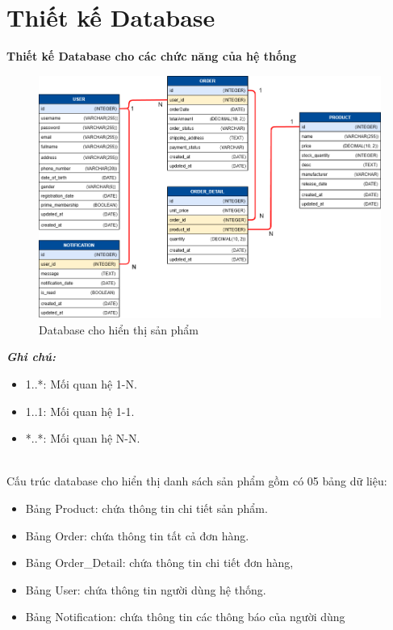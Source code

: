 \section{Thiết kế Database}
\textbf{Thiết kế Database cho các chức năng của hệ thống}
 \begin{figure}[H]
    \begin{center}
    \includegraphics[scale = 0.4]{images/phat/DB_Design-release.png}
    \vspace*{7mm}
    \caption{Database cho hiển thị sản phẩm}
    \end{center}
    \label{}
\end{figure}
\textbf{\textit{Ghi chú:}}
\begin{itemize}
    \item 1..*: Mối quan hệ 1-N.
    \item 1..1: Mối quan hệ 1-1.
    \item *..*: Mối quan hệ N-N.
\end{itemize}
\\[0.5cm]
\noindent Cấu trúc database cho hiển thị danh sách sản phẩm gồm có 05 bảng dữ liệu:
\begin{itemize}
    \item Bảng Product: chứa thông tin chi tiết sản phẩm.
    \item Bảng Order: chứa thông tin tất cả đơn hàng.
    \item Bảng Order\_Detail: chứa thông tin chi tiết đơn hàng, 
    \item Bảng User: chứa thông tin người dùng hệ thống.
    \item Bảng Notification: chứa thông tin các thông báo của người dùng
\end{itemize}
